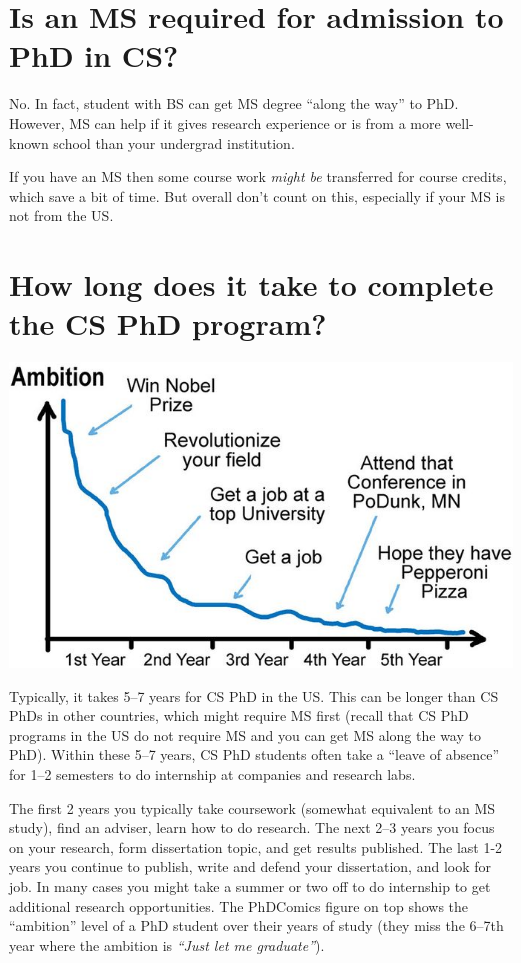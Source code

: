 \documentclass[oneside,11pt]{memoir}
\begin{document}
\section{Is an MS required for admission to PhD in CS?}\label{sec:msrequirement}
No. In fact, student with BS can get MS degree ``along the way'' to PhD.  However, MS can help if it gives research experience or is from a more well-known school than your undergrad institution. 

If you have an MS then some course work \emph{might be} transferred for course credits, which save a bit of time. But overall don't count on this, especially if your MS is not from the US. 


\section{How long does it take to complete the CS PhD program?}\label{sec:time}


\begin{center}
  \includegraphics[scale=0.3]{files/c4a.png}
\end{center}


Typically, it takes 5--7 years for CS PhD in the US.  This can be longer than CS PhDs in other countries, which might require MS first (recall that CS PhD programs in the US do not require MS and you can get MS along the way to PhD). Within these 5--7 years, CS PhD students often take a ``leave of absence'' for 1--2 semesters to do internship at companies and research labs.

The first 2 years you typically take coursework (somewhat equivalent to an MS study), find an adviser, learn how to do research.  The next 2--3 years you focus on your research, form dissertation topic, and get results published. The last 1-2 years you continue to publish, write and defend your dissertation, and look for job.
In many cases you might take a summer or two off to do internship to get additional research opportunities.
The PhDComics figure on top shows the ``ambition'' level of a PhD student over their years of study (they miss the 6--7th year where the ambition is \emph{``Just let me graduate''}).
\end{document}

